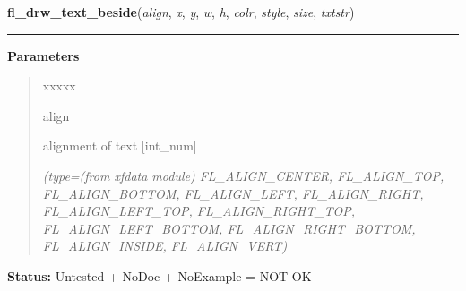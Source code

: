 \hspace{.8\funcindent}\begin{boxedminipage}{\funcwidth}

    \raggedright \textbf{fl\_drw\_text\_beside}(\textit{align}, \textit{x}, \textit{y}, \textit{w}, \textit{h}, \textit{colr}, \textit{style}, \textit{size}, \textit{txtstr})

    \vspace{-1.5ex}

    \rule{\textwidth}{0.5\fboxrule}
\setlength{\parskip}{2ex}
\setlength{\parskip}{1ex}
      \textbf{Parameters}
      \vspace{-1ex}

      \begin{quote}
        \begin{Ventry}{xxxxx}

          \item[align]

          alignment of text [int\_num]

            {\it (type=(from xfdata module) FL\_ALIGN\_CENTER, FL\_ALIGN\_TOP, FL\_ALIGN\_BOTTOM, 
FL\_ALIGN\_LEFT, FL\_ALIGN\_RIGHT, FL\_ALIGN\_LEFT\_TOP, 
FL\_ALIGN\_RIGHT\_TOP, FL\_ALIGN\_LEFT\_BOTTOM, FL\_ALIGN\_RIGHT\_BOTTOM, 
FL\_ALIGN\_INSIDE, FL\_ALIGN\_VERT)}

        \end{Ventry}

      \end{quote}

\textbf{Status:} Untested + NoDoc + NoExample = NOT OK



    \end{boxedminipage}

    \label{xformslib:library:fl_drw_text_cursor}

    \vspace{0.5ex}

